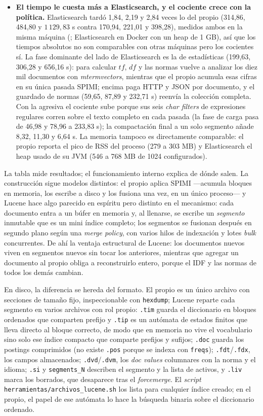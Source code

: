 \documentclass[11pt,spanish]{article}
\begin{document}
\begin{itemize}
  \item \textbf{El tiempo le cuesta más a Elasticsearch, y el cociente crece con la política.} Elasticsearch tardó 1,84, 2,19 y 2,84 veces lo del propio (314,86, 484,80 y $1\,129,83$ s contra 170,94, 221,01 y 398,28), medidos ambos en la misma máquina (\MedicionMeta; Elasticsearch en Docker con un heap de 1 GB), así que los tiempos absolutos no son comparables con otras máquinas pero los cocientes sí. La fase dominante del lado de Elasticsearch es la de estadísticas (199,63, 306,28 y 656,16 s): para calcular $tf$, $df$ y las normas vuelve a analizar los diez mil documentos con \emph{mtermvectors}, mientras que el propio acumula esas cifras en su única pasada SPIMI; encima paga HTTP y JSON por documento, y el guardado de normas (59,65, 87,89 y 232,71 s) reenvía la colección completa. Con la agresiva el cociente sube porque sus seis \emph{char filters} de expresiones regulares corren sobre el texto completo en cada pasada (la fase de carga pasa de 46,98 y 78,96 a 233,83 s); la compactación final a un solo segmento añade 8,32, 11,30 y 6,64 s. La memoria tampoco es directamente comparable: el propio reporta el pico de RSS del proceso (279 a 303 MB) y Elasticsearch el heap usado de su JVM (546 a 768 MB de 1024 configurados).
\end{itemize}

La tabla mide resultados; el funcionamiento interno explica de dónde salen. La construcción sigue modelos distintos: el propio aplica SPIMI ---acumula bloques en memoria, los escribe a disco y los fusiona una vez, en un único proceso--- y Lucene hace algo parecido en espíritu pero distinto en el mecanismo: cada documento entra a un búfer en memoria y, al llenarse, se escribe un \emph{segmento} inmutable que es un mini índice completo; los segmentos se fusionan después en segundo plano según una \emph{merge policy}, con varios hilos de indexación y lotes \emph{bulk} concurrentes. De ahí la ventaja estructural de Lucene: los documentos nuevos viven en segmentos nuevos sin tocar los anteriores, mientras que agregar un documento al propio obliga a reconstruirlo entero, porque el IDF y las normas de todos los demás cambian.

En disco, la diferencia se hereda del formato. El propio es un único archivo con secciones de tamaño fijo, inspeccionable con \texttt{hexdump}; Lucene reparte cada segmento en varios archivos con rol propio: \texttt{.tim} guarda el diccionario en bloques ordenados que comparten prefijo y \texttt{.tip} es un autómata de estados finitos que lleva directo al bloque correcto, de modo que en memoria no vive el vocabulario sino solo ese índice compacto que comparte prefijos y sufijos; \texttt{.doc} guarda los postings comprimidos (no existe \texttt{.pos} porque se indexa con \texttt{freqs}); \texttt{.fdt}/\texttt{.fdx}, los campos almacenados; \texttt{.dvd}/\texttt{.dvm}, los \emph{doc values} columnares con la norma y el idioma; \texttt{.si} y \texttt{segments\_N} describen el segmento y la lista de activos, y \texttt{.liv} marca los borrados, que desaparece tras el \emph{forcemerge}. El \emph{script} \texttt{herramientas/archivos\_lucene.sh} los lista para cualquier índice creado; en el propio, el papel de ese autómata lo hace la búsqueda binaria sobre el diccionario ordenado.
\end{document}
